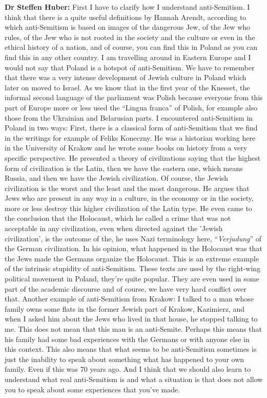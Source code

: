 \textbf{Dr Steffen Huber:} First I have to clarify how I understand anti-Semitism. I think that there is a quite useful definitions by Hannah Arendt, according to which anti-Semitism is based on images of the dangerous Jew, of the Jew who rules, of the Jew who is not rooted in the society and the culture or even in the ethical history of a nation, and of course, you can find this in Poland as you can find this in any other country. I am travelling around in Eastern Europe and I would not say that Poland is a hotspot of anti-Semitism. We have to remember that there was a very intense development of Jewish culture in Poland which later on moved to Israel. As we know that in the first year of the Knesset, the informal second language of the parliament was Polish because everyone from this part of Europe more or less used the “Lingua franca” of Polish, for example also those from the Ukrainian and Belarusian parts. I encountered anti-Semitism in Poland in two ways: First, there is a classical form of anti-Semitism that we find in the writings for example of Feliks Koneczny. He was a historian working here in the University of Krakow and he wrote some books on history from a very specific perspective. He presented a theory of civilizations saying that the highest form of civilization is the Latin, then we have the eastern one, which means Russia, and then we have the Jewish civilization. Of course, the Jewish civilization is the worst and the least and the most dangerous. He argues that Jews who are present in any way in a culture, in the economy or in the society, more or less destroy this higher civilization of the Latin type. He even came to the conclusion that the Holocaust, which he called a crime that was not acceptable in any civilization, even when directed against the 'Jewish civilization', is the outcome of the, he uses Nazi terminology here, ``\textit{Verjudung}'' of the German civilization. In his opinion, what happened in the Holocaust was that the Jews made the Germans organize the Holocaust. This is an extreme example of the intrinsic stupidity of anti-Semitism. These texts are used by the right-wing political movement in Poland, they're quite popular. They are even used in some part of the academic discourse and of course, we have very hard conflict over that.  Another example of anti-Semitism from Krakow: I talked to a man whose family owns some flats in the former Jewish part of Krakow, Kazimierz, and when I asked him about the Jews who lived in that house, he stopped talking to me. This does not mean that this man is an anti-Semite. Perhaps this means that his family had some bad experiences with the Germans or with anyone else in this context. This also means that what seems to be anti-Semitism sometimes is just the inability to speak about something what has happened to your own family. Even if this was 70 years ago. And I think that we should also learn to understand what real anti-Semitism is and what a situation is that does not allow you to speak about some experiences that you’ve made. 

